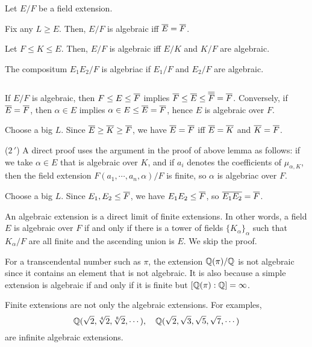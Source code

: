 \documentclass{../exp}
\begin{document}
\begin{thm}
Let $E/F$ be a field extension.
\begin{cond}
\item Fix any $L\ge E$. Then, $E/F$ is algebraic iff $\overline E=\overline F$.
\item Let $F\le K\le E$. Then, $E/F$ is algebraic iff $E/K$ and $K/F$ are algebraic.
\item The compositum $E_1E_2/F$ is algebriac if $E_1/F$ and $E_2/F$ are algebraic.
\end{cond}
\end{thm}
\begin{pf}$ $\\[-12pt]
\begin{cond}
\item
If $E/F$ is algebraic, then $F\le E\le\overline F$ implies $\overline F\le\overline E\le\overline{\overline F}=\overline F$.
Conversely, if $\overline E=\overline F$, then $\alpha\in E$ implies $\alpha\in E\le\overline E=\overline F$, hence $E$ is algebraic over $F$.

\item
Choose a big $L$.
Since $\overline E\ge\overline K\ge\overline F$, we have $\overline E=\overline F$ iff $\overline E=\overline K$ and $\overline K=\overline F$.

\item[($2\,'$)]
A direct proof uses the argument in the proof of above lemma as follows: if we take $\alpha\in E$ that is algebraic over $K$, and if $a_i$ denotes the coefficients of $\mu_{\alpha,K}$, then the field extension $F(a_1,\cdots,a_n,\alpha)/F$ is finite, so $\alpha$ is algebriac over $F$.

\item
Choose a big $L$.
Since $E_1,E_2\le\overline F$, we have $E_1E_2\le\overline F$, so $\overline{E_1E_2}=\overline{F}$.\qedhere
\end{cond}
\end{pf}

\begin{rmk}
An algebraic extension is a direct limit of finite extensions.
In other words, a field $E$ is algebraic over $F$ if and only if there is a tower of fields $\{K_\alpha\}_\alpha$ such that $K_\alpha/F$ are all finite and the ascending union is $E$.
We skip the proof.
\end{rmk}



\begin{exs}
\item
For a transcendental number such as $\pi$, the extension $\mathbb{Q}(\pi)/\mathbb{Q}$ is not algebraic since it contains an element that is not algebraic.
It is also because a simple extension is algebraic if and only if it is finite but $[\mathbb{Q}(\pi):\mathbb{Q}]=\infty$.

\item
Finite extensions are not only the algebraic extensions.
For examples,
\[\mathbb{Q}(\sqrt2,\sqrt[4]2,\sqrt[8]2,\cdots),\quad\mathbb{Q}(\sqrt2,\sqrt3,\sqrt5,\sqrt7,\cdots)\]
are infinite algebraic extensions.
\end{exs}
\end{document}
